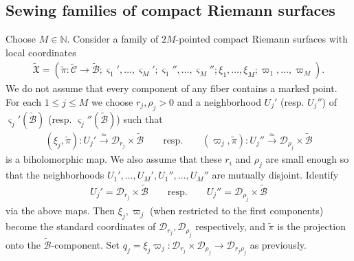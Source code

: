\documentclass[12pt,b5paper,notitlepage]{report}
\theoremstyle{definition}
\theoremstyle{plain}
\newcommand{\fk}{\mathfrak}
\newcommand{\mc}{\mathcal}
\newcommand{\wtd}{\widetilde}
\newcommand{\sgm}{\varsigma}
\numberwithin{equation}{section}
\begin{document}





\subsection*{Sewing families of compact Riemann surfaces}

Choose $M\in\mathbb N$. Consider a family of $2M$-pointed compact Riemann surfaces with local coordinates
\begin{align}
\wtd{\fk X}=(\wtd\pi:\wtd{\mc C}\rightarrow\wtd{\mc B};\sgm_1',\dots,\sgm_M';\sgm_1'',\dots,\sgm_M'';\xi_1,\dots,\xi_M;\varpi_1,\dots,\varpi_M).\label{eq61}
\end{align}
We do not assume that every component of any fiber contains a marked point. For each $1\leq j\leq M$ we choose $r_j,\rho_j>0$ and a neighborhood $U_j'$ (resp. $U_j''$) of $\sgm_j'(\wtd {\mc B})$ (resp. $\sgm_j''(\wtd {\mc B})$) such that
\begin{gather}
(\xi_j,\wtd\pi):U_j'\xrightarrow{\simeq} \mc D_{r_j}\times\wtd{\mc B}\qquad\text{resp.}\qquad (\varpi_j,\wtd\pi):U_j''\xrightarrow{\simeq} \mc D_{\rho_j}\times\wtd{\mc B}\label{eq113}
\end{gather}
is a biholomorphic map. We also assume that these $r_i$ and $\rho_j$ are small enough so that the neighborhoods $U_1',\dots,U_M',U_1'',\dots,U_M''$ are mutually disjoint. Identify
\begin{gather*}
U_j'=\mc D_{r_j}\times\wtd{\mc B}\qquad\text{resp.}\qquad U_j''=\mc D_{\rho_j}\times\wtd{\mc B}
\end{gather*}
via the above maps. Then $\xi_j,\varpi_j$ (when restricted to the first components) become the standard coordinates of $\mc D_{r_j},\mc D_{\rho_j}$ respectively, and $\wtd\pi$ is the projection onto the $\wtd{\mc B}$-component. Set $q_j=\xi_j\varpi_j:\mc D_{r_j}\times\mc D_{\rho_j}\rightarrow\mc D_{r_j\rho_j}$ as previously.  
\end{document}
